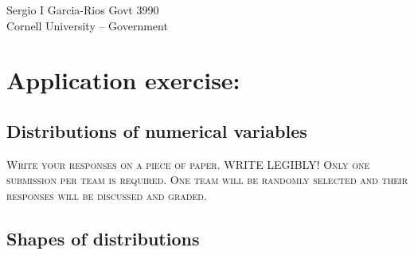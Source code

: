 \documentclass[12pt]{article}
\begin{document}

Sergio I Garcia-Rios \hfill Govt 3990 \\
Cornell University -- Government \hfill \\

\section*{Application exercise:} 
\subsection*{Distributions of numerical variables}

\textsc{Write your responses on a piece of paper. WRITE LEGIBLY! Only one submission per team is required. One team will be randomly selected and their responses will be discussed and graded.}

\subsection*{Shapes of distributions}
\end{document}
